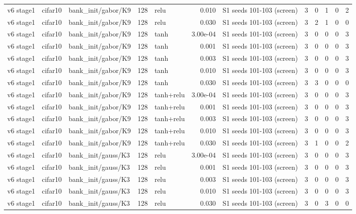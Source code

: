 \begin{table}[htbp]
{\begin{tabular}{@{}lllrlrlrrrrr@{}}
v6 stage1 & cifar10 & bank\_init/gabor/K9 & 128 & relu & 0.010 & S1 seeds 101-103 (screen) & 3 & 0 & 1 & 0 & 2 \\
v6 stage1 & cifar10 & bank\_init/gabor/K9 & 128 & relu & 0.030 & S1 seeds 101-103 (screen) & 3 & 2 & 1 & 0 & 0 \\
v6 stage1 & cifar10 & bank\_init/gabor/K9 & 128 & tanh & 3.00e-04 & S1 seeds 101-103 (screen) & 3 & 0 & 0 & 0 & 3 \\
v6 stage1 & cifar10 & bank\_init/gabor/K9 & 128 & tanh & 0.001 & S1 seeds 101-103 (screen) & 3 & 0 & 0 & 0 & 3 \\
v6 stage1 & cifar10 & bank\_init/gabor/K9 & 128 & tanh & 0.003 & S1 seeds 101-103 (screen) & 3 & 0 & 0 & 0 & 3 \\
v6 stage1 & cifar10 & bank\_init/gabor/K9 & 128 & tanh & 0.010 & S1 seeds 101-103 (screen) & 3 & 0 & 0 & 0 & 3 \\
v6 stage1 & cifar10 & bank\_init/gabor/K9 & 128 & tanh & 0.030 & S1 seeds 101-103 (screen) & 3 & 3 & 0 & 0 & 0 \\
v6 stage1 & cifar10 & bank\_init/gabor/K9 & 128 & tanh+relu & 3.00e-04 & S1 seeds 101-103 (screen) & 3 & 0 & 0 & 0 & 3 \\
v6 stage1 & cifar10 & bank\_init/gabor/K9 & 128 & tanh+relu & 0.001 & S1 seeds 101-103 (screen) & 3 & 0 & 0 & 0 & 3 \\
v6 stage1 & cifar10 & bank\_init/gabor/K9 & 128 & tanh+relu & 0.003 & S1 seeds 101-103 (screen) & 3 & 0 & 0 & 0 & 3 \\
v6 stage1 & cifar10 & bank\_init/gabor/K9 & 128 & tanh+relu & 0.010 & S1 seeds 101-103 (screen) & 3 & 0 & 0 & 0 & 3 \\
v6 stage1 & cifar10 & bank\_init/gabor/K9 & 128 & tanh+relu & 0.030 & S1 seeds 101-103 (screen) & 3 & 1 & 0 & 0 & 2 \\
v6 stage1 & cifar10 & bank\_init/gauss/K3 & 128 & relu & 3.00e-04 & S1 seeds 101-103 (screen) & 3 & 0 & 0 & 0 & 3 \\
v6 stage1 & cifar10 & bank\_init/gauss/K3 & 128 & relu & 0.001 & S1 seeds 101-103 (screen) & 3 & 0 & 0 & 0 & 3 \\
v6 stage1 & cifar10 & bank\_init/gauss/K3 & 128 & relu & 0.003 & S1 seeds 101-103 (screen) & 3 & 0 & 0 & 0 & 3 \\
v6 stage1 & cifar10 & bank\_init/gauss/K3 & 128 & relu & 0.010 & S1 seeds 101-103 (screen) & 3 & 0 & 0 & 0 & 3 \\
v6 stage1 & cifar10 & bank\_init/gauss/K3 & 128 & relu & 0.030 & S1 seeds 101-103 (screen) & 3 & 0 & 3 & 0 & 0 \\

\end{tabular}}
\end{table}

